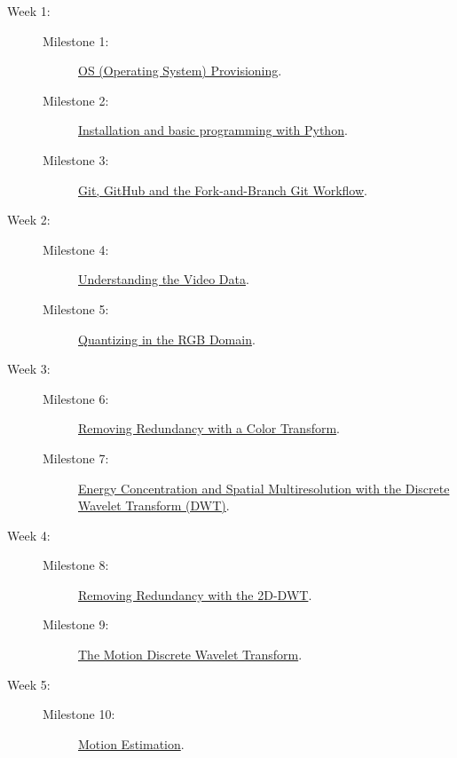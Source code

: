 \begin{description}
\item [Week 1:]
  \begin{description}
  \item [Milestone 1:] \href{https://sistemas-multimedia.github.io/milestones/01-provisioning/}{OS (Operating System) Provisioning}.
  \item [Milestone 2:] \href{https://sistemas-multimedia.github.io/milestones/02-python/}{Installation and basic programming with Python}.
  \item [Milestone 3:] \href{https://sistemas-multimedia.github.io/milestones/03-git/}{Git, GitHub and the Fork-and-Branch Git Workflow}.
  \end{description}
\item [Week 2:]
  \begin{description}
  \item [Milestone 4:] \href{https://sistemas-multimedia.github.io/milestones/04-the_data/}{Understanding the Video Data}.
  \item [Milestone 5:] \href{https://sistemas-multimedia.github.io/milestones/05-quantization/}{Quantizing in the RGB Domain}.
  \end{description}
\item [Week 3:]
  \begin{description}
  \item [Milestone 6:] \href{https://sistemas-multimedia.github.io/milestones/06-color_transform/}{Removing Redundancy with a Color Transform}.
  \item [Milestone 7:] \href{https://sistemas-multimedia.github.io/milestones/07-DWT/}{Energy Concentration and Spatial Multiresolution with the Discrete Wavelet Transform (DWT)}.
  \end{description}
\item [Week 4:]
  \begin{description}
  \item [Milestone 8:] \href{https://sistemas-multimedia.github.io/milestones/08-2D-DWT/}{Removing Redundancy with the 2D-DWT}.
  \item [Milestone 9:] \href{https://sistemas-multimedia.github.io/milestones/09-MDWT/}{The Motion Discrete Wavelet Transform}.
  \end{description}
\item [Week 5:]
  \begin{description}
  \item [Milestone 10:] \href{https://sistemas-multimedia.github.io/milestones/10-ME/}{Motion Estimation}.

\end{description}
\end{description}
